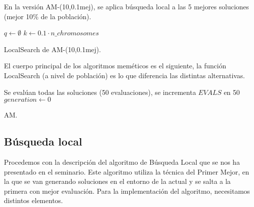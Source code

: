 \documentclass{article}
\begin{document}
En la versión AM-(10,0.1mej), se aplica búsqueda local a las 5 mejores soluciones (mejor 10\% de la población).

\begin{algorithm}[H]
	\DontPrintSemicolon %
	$q\gets\emptyset$ 
	$k\gets 0.1\cdot n\_chromosomes$ 
	\caption{{\sc LocalSearch} de AM-(10,0.1mej).}
	\label{alg:am-10-01mej}
\end{algorithm}

El cuerpo principal de los algoritmos meméticos es el siguiente, la función LocalSearch (a nivel de población) es lo que diferencia
las distintas alternativas.

\begin{algorithm}[H]
	\DontPrintSemicolon %
	Se evalúan todas las soluciones (50 evaluaciones), se incrementa $EVALS$ en 50\;
	$generation\gets 0$\;
	\caption{{\sc AM}.}
	\label{alg:am}
\end{algorithm}

\pagebreak

\subsection{Búsqueda local}

Procedemos con la descripción del algoritmo de Búsqueda Local que se nos ha presentado en el seminario. 
Este algoritmo utiliza la técnica del Primer Mejor, en la que se van generando soluciones en el entorno de la actual y se
salta a la primera con mejor evaluación. Para la implementación del algoritmo, necesitamos distintos elementos.
\end{document}
